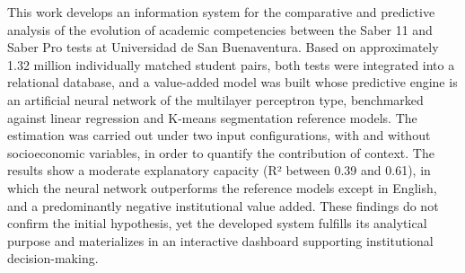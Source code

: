 This work develops an information system for the comparative and predictive analysis of the evolution of academic competencies between the Saber 11 and Saber Pro tests at Universidad de San Buenaventura. Based on approximately 1.32 million individually matched student pairs, both tests were integrated into a relational database, and a value-added model was built whose predictive engine is an artificial neural network of the multilayer perceptron type, benchmarked against linear regression and K-means segmentation reference models. The estimation was carried out under two input configurations, with and without socioeconomic variables, in order to quantify the contribution of context. The results show a moderate explanatory capacity (R² between 0.39 and 0.61), in which the neural network outperforms the reference models except in English, and a predominantly negative institutional value added. These findings do not confirm the initial hypothesis, yet the developed system fulfills its analytical purpose and materializes in an interactive dashboard supporting institutional decision-making.



